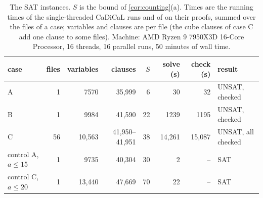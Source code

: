 \begin{table}[ht]
\centering
\caption{The SAT instances. $S$ is the bound of \cref{cor:counting}(a). Times
are the running times of the single-threaded CaDiCaL runs and of
 on their proofs, summed over the files of a case; variables
and clauses are per file (the cube clauses of case \textsf{C} add one clause
to some files). Machine: AMD Ryzen 9 7950X3D 16-Core Processor, 16 threads, 16 parallel runs, 50 minutes of wall time.}
\label{tab:results}
\small
\begin{tabular}{@{}lrrrrrrl@{}}
\toprule
case & files & variables & clauses & $S$ & solve (s) & check (s) & result\\
\midrule
\textsf{A} & 1 & 7570 & 35{,}999 & 6 & 30 & 32 & UNSAT, checked\\
\textsf{B} & 1 & 9984 & 41{,}590 & 22 & 1239 & 1195 & UNSAT, checked\\
\textsf{C} & 56 & 10{,}563 & 41{,}950--41{,}951 & 38 & 14{,}261 & 15{,}087 & UNSAT, all checked\\
control \textsf{A}, $a\le 15$ & 1 & 9735 & 40{,}304 & 30 & 2 & -- & SAT\\
control \textsf{C}, $a\le 20$ & 1 & 13{,}440 & 47{,}669 & 70 & 22 & -- & SAT\\
\bottomrule
\end{tabular}
\end{table}
